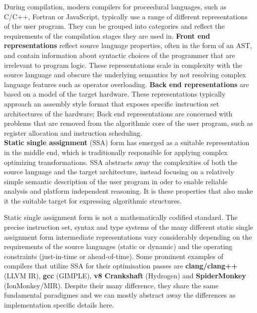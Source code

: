     During compilation, modern compilers for proceedural languages, such as
    C/C++, Fortran or JavaScript, typically use a range of different
    representations of the user program.
    They can be grouped into categories and reflect the requirements of
    the compilation stages they are used in.
    \linebreak
    {\bf Front end representations} reflect source language properties,
    often in the form of an AST, and contain information about syntactic choices
    of the programmer that are irrelevant to program logic.
    These representations scale in complexity with the source language and
    obscure the underlying semantics by not resolving complex language features
    such as operator overloading.
    \linebreak
    {\bf Back end representations} are based on a model of the target hardware.
    These representations typically approach an assembly style format that
    exposes specific instruction set architectures of the hardware;
    Back end representations are concerned with problems that are removed from
    the algorithmic core of the user program, such as register allocation and
    instruction scheduling.
    \\
    {\bf Static single assignment} (SSA) form has emerged as a suitable
    representation in the middle end, which is traditionally responsible for
    applying complex optimizing transformations.
    SSA abstracts away the complexities of both the source language and the
    target architecture, instead focusing on a relatively simple semantic
    description of the user program in oder to enable reliable analysis and
    platform independent reasoning.
    It is these properties that also make it the suitable target for expressing
    algorithmic structures.

    Static single assignment form is not a mathematically codified standard.
    The precise instruction set, syntax and type systems of the many different
    static single assignment form intermediate representations vary considerably
    depending on the requirements of the source languages (static or dynamic)
    and the operating constraints (just-in-time or ahead-of-time).
    Some prominent examples of compilers that utilize SSA for their
    optimisation passes are {\bf clang/clang++} (LLVM IR), {\bf gcc} (GIMPLE),
    {\bf v8 Crankshaft} (Hydrogen) and {\bf SpiderMonkey} (IonMonkey/MIR).
    Despite their many difference, they share the same fundamental paradigmes
    and we can mostly abstract away the differences as implementation specific
    details here.

